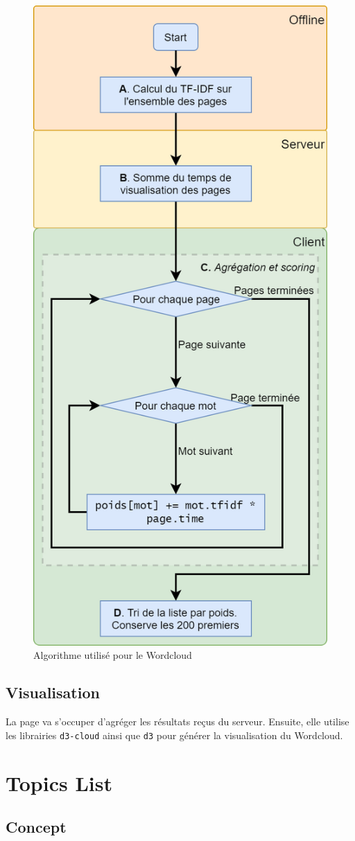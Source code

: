		\begin{figure}[!h]
			\centering
			\includegraphics[height=1.15\textwidth]{images/design/pages/wordcloud_algo}
			\caption{Algorithme utilisé pour le Wordcloud}
			\label{wordcloud_algo}
		\end{figure}

	\subsection{Visualisation}

			La page va s'occuper d'agréger les résultats reçus du serveur. Ensuite, elle utilise les librairies \texttt{d3-cloud} ainsi que \texttt{d3} pour générer la visualisation du Wordcloud.

\clearpage

%
%
%
%

\section{Topics List}\label{topicslist}

	\subsection{Concept}

